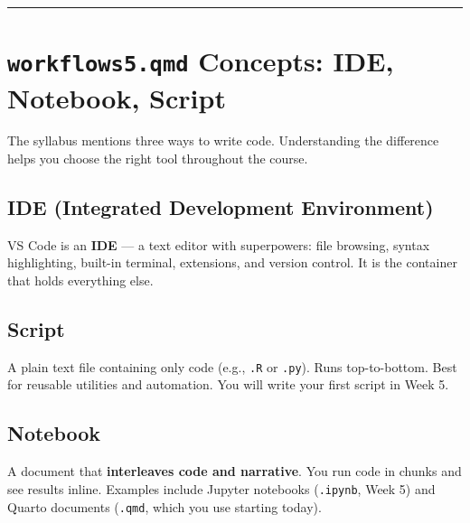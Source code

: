 \documentclass[
  letterpaper,
  DIV=11,
  numbers=noendperiod,
  oneside]{scrreprt}
\begin{document}
\begin{center}\rule{0.5\linewidth}{0.5pt}\end{center}

\section*{\texorpdfstring{\texttt{workflows5.qmd} Concepts: IDE,
Notebook,
Script}{workflows5.qmd Concepts: IDE, Notebook, Script}}\label{workflows5.qmd-concepts-ide-notebook-script}


The syllabus mentions three ways to write code. Understanding the
difference helps you choose the right tool throughout the course.

\subsection*{IDE (Integrated Development
Environment)}\label{ide-integrated-development-environment}

VS Code is an \textbf{IDE} --- a text editor with superpowers: file
browsing, syntax highlighting, built-in terminal, extensions, and
version control. It is the container that holds everything else.

\subsection*{Script}\label{script}

A plain text file containing only code (e.g., \texttt{.R} or
\texttt{.py}). Runs top-to-bottom. Best for reusable utilities and
automation. You will write your first script in Week 5.

\subsection*{Notebook}\label{notebook}

A document that \textbf{interleaves code and narrative}. You run code in
chunks and see results inline. Examples include Jupyter notebooks
(\texttt{.ipynb}, Week 5) and Quarto documents (\texttt{.qmd}, which you
use starting today).
\end{document}
